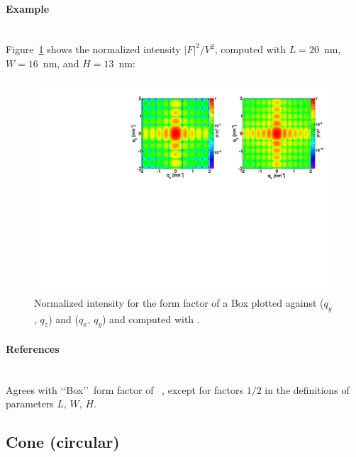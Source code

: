 \paragraph{Example}\strut\\
Figure~\ref{fig:FFBoxEx} shows the normalized intensity
$|F|^2/V^2$, computed with $L=20$~nm, $W=16$~nm, and $H=13$~nm:

\begin{figure}[h]
\begin{center}
\includegraphics[angle=-90,width=\textwidth]{fig/ff/figffbox.pdf}
\end{center}
\caption{Normalized intensity for the form factor of a Box plotted against ($q_y$, $q_z$) and  ($q_x$, $q_y$) and computed with .}
\label{fig:FFBoxEx}
\end{figure}

\paragraph{References}\strut\\
Agrees with \lq\lq Box\rq\rq\ form factor of \IsGISAXS~\cite{Laz02},
except for factors $1/2$ in the definitions of parameters $L$, $W$, $H$.

\clearpage
\subsection{Cone (circular)} \label{sec:Cone} 

